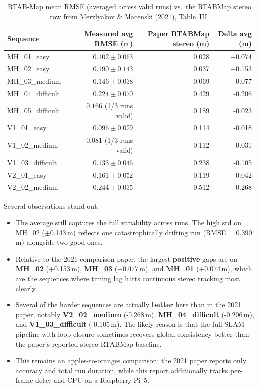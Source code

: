 \documentclass[11pt]{article}
\begin{document}
\begin{table}[H]
\centering
\small
\caption{RTAB-Map mean RMSE (averaged across valid runs) vs.\ the RTABMap stereo row from Merzlyakov \& Macenski (2021), Table~III.}
\label{tab:rtabmap_vs_paper}
\begin{tabular}{lrrr}
\toprule
Sequence & Measured avg RMSE (m) & Paper RTABMap stereo (m) & Delta avg (m) \\
\midrule
MH\_01\_easy       & $0.102 \pm 0.063$ & 0.028 & +0.074 \\
MH\_02\_easy       & $0.190 \pm 0.143$ & 0.037 & +0.153 \\
MH\_03\_medium     & $0.146 \pm 0.038$ & 0.069 & +0.077 \\
MH\_04\_difficult  & $0.224 \pm 0.070$ & 0.429 & -0.206 \\
MH\_05\_difficult  & $0.166$ (1/3 runs valid) & 0.189 & -0.023 \\
V1\_01\_easy       & $0.096 \pm 0.029$ & 0.114 & -0.018 \\
V1\_02\_medium     & $0.081$ (1/3 runs valid) & 0.112 & -0.031 \\
V1\_03\_difficult  & $0.133 \pm 0.046$ & 0.238 & -0.105 \\
V2\_01\_easy       & $0.161 \pm 0.052$ & 0.119 & +0.042 \\
V2\_02\_medium     & $0.244 \pm 0.035$ & 0.512 & -0.268 \\
\bottomrule
\end{tabular}
\end{table}

Several observations stand out:
\begin{itemize}
    \item The average still captures the full variability across runs. The high std on MH\_02 ($\pm$0.143\,m) reflects one catastrophically drifting run (RMSE = 0.390\,m) alongside two good ones.
    \item Relative to the 2021 comparison paper, the largest \textbf{positive} gaps are on \textbf{MH\_02} (+0.153\,m), \textbf{MH\_03} (+0.077\,m), and \textbf{MH\_01} (+0.074\,m), which are the sequences where timing lag hurts continuous stereo tracking most clearly.
    \item Several of the harder sequences are actually \textbf{better} here than in the 2021 paper, notably \textbf{V2\_02\_medium} (-0.268\,m), \textbf{MH\_04\_difficult} (-0.206\,m), and \textbf{V1\_03\_difficult} (-0.105\,m). The likely reason is that the full SLAM pipeline with loop closure sometimes recovers global consistency better than the paper's reported stereo RTABMap baseline.
    \item This remains an apples-to-oranges comparison: the 2021 paper reports only accuracy and total run duration, while this report additionally tracks per-frame delay and CPU on a Raspberry Pi~5.
\end{itemize}
\end{document}
